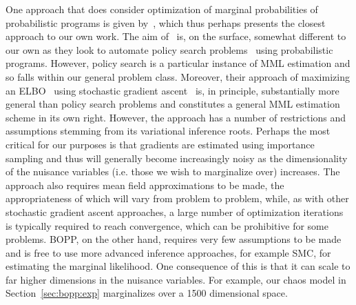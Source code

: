 One approach that does consider optimization of marginal probabilities of probabilistic
programs is given by~\cite{vandemeent2016black}, which thus perhaps presents the closest
approach to our own work.  The aim of~\cite{vandemeent2016black} is, on the surface, somewhat
different to our own as they look to automate policy search problems~\citep{deisenroth2013survey}
using probabilistic programs.  However, policy search is a particular instance of MML estimation
and so falls within our general problem class.  Moreover, their approach of maximizing an ELBO~\citep{blei2016variational}
using stochastic gradient ascent~\citep{robbins1951stochastic} is, in principle, substantially
more general than policy search problems and constitutes a general MML estimation scheme in its own right.
However, the approach has a number of restrictions and assumptions stemming from its variational 
inference roots.  Perhaps the most critical for our purposes is that gradients are estimated using
importance sampling and thus will generally become increasingly noisy as the dimensionality of the nuisance variables (i.e. those we wish to marginalize over) increases.
The approach also requires mean field approximations
to be made, the appropriateness of which will vary from problem to problem, while, as with other
stochastic gradient ascent approaches, a large number of optimization iterations is typically required
to reach convergence, which can be prohibitive for some problems.  BOPP, on the other hand, requires
very few assumptions to be made and is free to use more advanced inference approaches, for example
SMC, for estimating the marginal likelihood.  One consequence of this is that it can scale to far
higher dimensions in the nuisance variables.  For example, our chaos model in Section~\ref{sec:bopp:exp}
marginalizes over a 1500 dimensional space.

